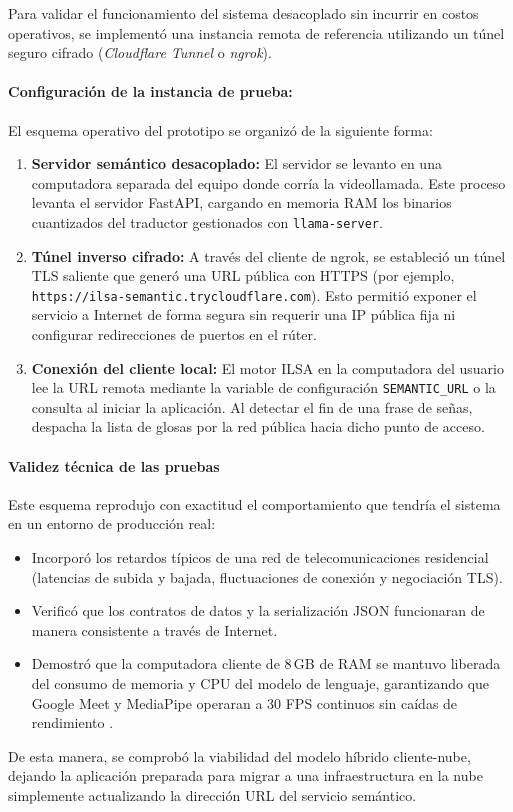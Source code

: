 Para validar el funcionamiento del sistema desacoplado sin incurrir en costos operativos, se implementó una instancia remota de referencia utilizando un túnel seguro cifrado (\textit{Cloudflare Tunnel} o \textit{ngrok}).

\paragraph{Configuración de la instancia de prueba:}
El esquema operativo del prototipo se organizó de la siguiente forma:
\begin{enumerate}
    \item \textbf{Servidor semántico desacoplado:} El servidor se levanto en una computadora separada del equipo donde corría la videollamada. Este proceso levanta el servidor FastAPI, cargando en memoria RAM los binarios cuantizados del traductor gestionados con \texttt{llama-server}.
    \item \textbf{Túnel inverso cifrado:} A través del cliente de ngrok, se estableció un túnel TLS saliente que generó una URL pública con HTTPS (por ejemplo, \texttt{https://ilsa-semantic.trycloudflare.com}). Esto permitió exponer el servicio a Internet de forma segura sin requerir una IP pública fija ni configurar redirecciones de puertos en el rúter.
    \item \textbf{Conexión del cliente local:} El motor ILSA en la computadora del usuario lee la URL remota mediante la variable de configuración \texttt{SEMANTIC\_URL} o la consulta al iniciar la aplicación. Al detectar el fin de una frase de señas, despacha la lista de glosas por la red pública hacia dicho punto de acceso.
\end{enumerate}

\paragraph{Validez técnica de las pruebas}
Este esquema reprodujo con exactitud el comportamiento que tendría el sistema en un entorno de producción real:
\begin{itemize}
    \item Incorporó los retardos típicos de una red de telecomunicaciones residencial (latencias de subida y bajada, fluctuaciones de conexión y negociación TLS).
    \item Verificó que los contratos de datos y la serialización JSON funcionaran de manera consistente a través de Internet.
    \item Demostró que la computadora cliente de 8\,GB de RAM se mantuvo liberada del consumo de memoria y CPU del modelo de lenguaje, garantizando que Google Meet y MediaPipe operaran a 30 FPS continuos sin caídas de rendimiento \parencite{google2020mediapipe}.
\end{itemize}

De esta manera, se comprobó la viabilidad del modelo híbrido cliente-nube, dejando la aplicación preparada para migrar a una infraestructura en la nube simplemente actualizando la dirección URL del servicio semántico.